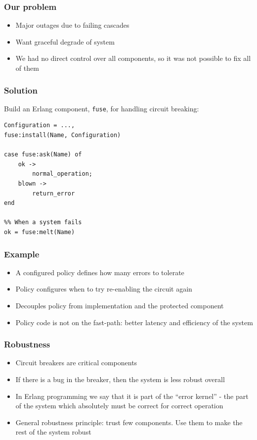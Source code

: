 \documentclass[lualatex]{beamer}
\begin{document}
\begin{frame}
  \frametitle{Our problem}
  \begin{itemize}
  \item Major outages due to failing cascades
  \item Want graceful degrade of system
  \item We had no direct control over all components, so it was not
    possible to fix all of them
  \end{itemize}
\end{frame}

\begin{frame}[fragile]
  \frametitle{Solution}
  Build an Erlang component, \texttt{fuse}, for handling circuit breaking:
\begin{verbatim}
Configuration = ...,
fuse:install(Name, Configuration)

case fuse:ask(Name) of
    ok ->
        normal_operation;
    blown ->
        return_error
end

%% When a system fails
ok = fuse:melt(Name)
\end{verbatim}
\end{frame}

\begin{frame}[fragile]
  \frametitle{Example}
  \begin{itemize}
  \item A configured policy defines how many errors to tolerate
  \item Policy configures when to try re-enabling the circuit again
  \item Decouples policy from implementation and the protected
    component
  \item Policy code is not on the fast-path: better latency and
    efficiency of the system
  \end{itemize}
\end{frame}

\begin{frame}
  \frametitle{Robustness}
  \begin{itemize}
  \item Circuit breakers are critical components
  \item If there is a bug in the breaker, then the system is less
    robust overall
  \item In Erlang programming we say that it is part of the ``error
    kernel'' - the part of the system which absolutely must be correct
    for correct operation
  \item General robustness principle: trust few components. Use them
    to make the rest of the system robust
  \end{itemize}
\end{frame}
\end{document}
